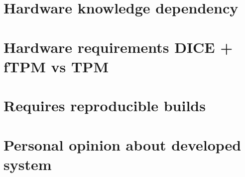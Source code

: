 
\section{Hardware knowledge dependency}



\section{Hardware requirements DICE + fTPM vs TPM}


\section{Requires reproducible builds}


\section{Personal opinion about developed system}

